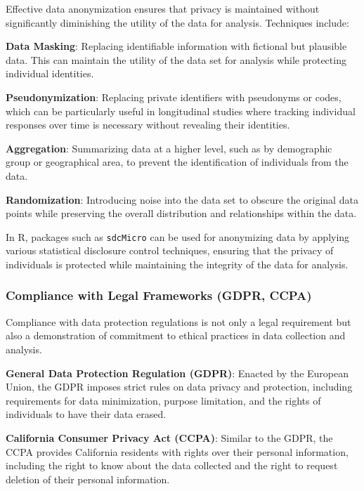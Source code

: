 \documentclass[
]{book}
\begin{document}
Effective data anonymization ensures that privacy is maintained without significantly diminishing the utility of the data for analysis. Techniques include:

\textbf{Data Masking}: Replacing identifiable information with fictional but plausible data. This can maintain the utility of the data set for analysis while protecting individual identities.

\textbf{Pseudonymization}: Replacing private identifiers with pseudonyms or codes, which can be particularly useful in longitudinal studies where tracking individual responses over time is necessary without revealing their identities.

\textbf{Aggregation}: Summarizing data at a higher level, such as by demographic group or geographical area, to prevent the identification of individuals from the data.

\textbf{Randomization}: Introducing noise into the data set to obscure the original data points while preserving the overall distribution and relationships within the data.

In R, packages such as \texttt{sdcMicro} can be used for anonymizing data by applying various statistical disclosure control techniques, ensuring that the privacy of individuals is protected while maintaining the integrity of the data for analysis.

\hypertarget{compliance-with-legal-frameworks-gdpr-ccpa}{%
\subsubsection*{Compliance with Legal Frameworks (GDPR, CCPA)}\label{compliance-with-legal-frameworks-gdpr-ccpa}}

Compliance with data protection regulations is not only a legal requirement but also a demonstration of commitment to ethical practices in data collection and analysis.

\textbf{General Data Protection Regulation (GDPR)}: Enacted by the European Union, the GDPR imposes strict rules on data privacy and protection, including requirements for data minimization, purpose limitation, and the rights of individuals to have their data erased.

\textbf{California Consumer Privacy Act (CCPA)}: Similar to the GDPR, the CCPA provides California residents with rights over their personal information, including the right to know about the data collected and the right to request deletion of their personal information.
\end{document}
